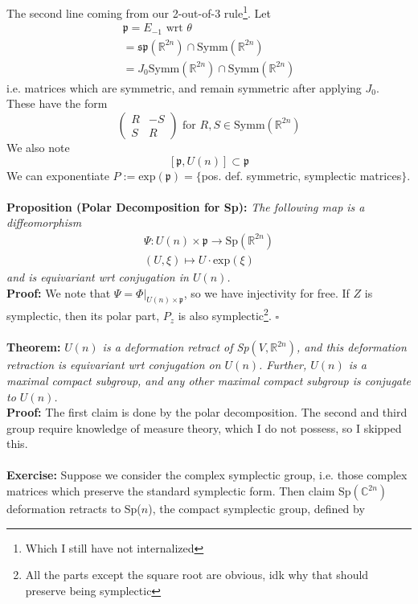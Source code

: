 \documentclass[12pt]{report}
\theoremstyle{definition}
\theoremstyle{remark}
\numberwithin{equation}{section}
\theoremstyle{definition}
\newcommand{\bb}[1]{\mathbb{#1}}
\newcommand{\mqed}{\hfill\newline\null \hfill$\square$\\ }
\begin{document}
The second line coming from our 2-out-of-3 rule\footnote{Which I still have not internalized}. Let
\begin{gather*}
	\mathfrak{p} = E_{-1} \text{ wrt } \theta\\
	= \mathfrak{sp}(\bb R^{2n}) \cap \text{Symm}(\bb R^{2n})\\
	= J_0 \text{Symm}(\bb R^{2n}) \cap \text{Symm}(\bb R^{2n})
\end{gather*} 
	i.e. matrices which are symmetric, and remain symmetric after applying $J_0$. These have the form 
$$
	\begin{pmatrix} R & -S \\ S & R \end{pmatrix}\text{     for } R,S \in \text{Symm}(\bb R^{2n})
$$
We also note 
$$
	[\mathfrak{p},U(n)] \subset \mathfrak{p}
$$
We can exponentiate $P := \text{exp}\mathfrak{(p)} = \{$pos. def. symmetric, symplectic matrices$\}$. \\\\
\textbf{Proposition (Polar Decomposition for Sp): }\textit{The following map is a diffeomorphism}
\begin{gather*}
	\Psi: U(n) \times \mathfrak{p} \to \text{Sp}(\bb R^{2n}) \\
	(U,\xi) \mapsto U \cdot \text{exp}(\xi) 
\end{gather*}
\textit{and is equivariant wrt conjugation in $U(n)$.}\\
\textbf{Proof: }We note that $\Psi = \Phi|_{U(n) \times \mathfrak{p}}$, so we have injectivity for free. If $Z$ is symplectic, then its polar part, $P_z$ is also symplectic\footnote{All the parts except the square root are obvious, idk why that should preserve being symplectic}. \mqed\\
\textbf{Theorem: }\textit{$U(n)$ is a deformation retract of Sp$(V,\bb R^{2n})$, and this deformation retraction is equivariant wrt conjugation on $U(n)$. Further, $U(n)$ is a maximal compact subgroup, and any other maximal compact subgroup is conjugate to $U(n)$. }\\
\textbf{Proof: }The first claim is done by the polar decomposition. The second and third group require knowledge of measure theory, which I do not possess, so I skipped this. \\\\
\textbf{Exercise: }Suppose we consider the complex symplectic group, i.e. those complex matrices which preserve the standard symplectic form. Then claim Sp$(\bb C^{2n})$ deformation retracts to Sp($n$), the compact symplectic group, defined by 
\end{document}
